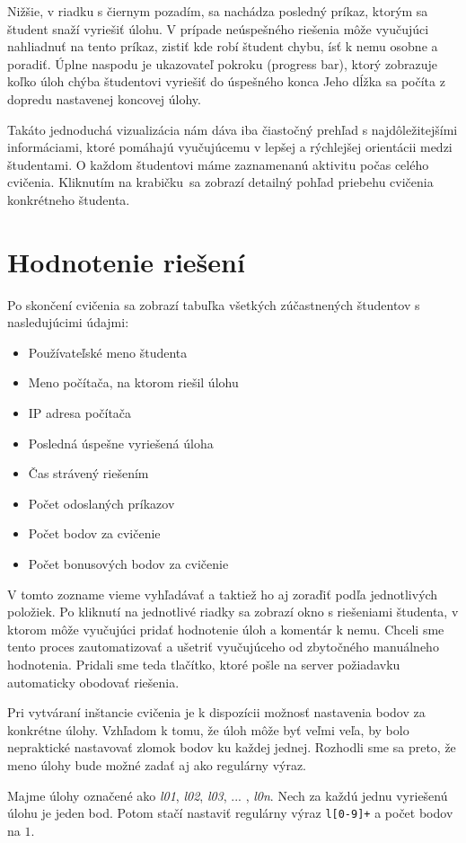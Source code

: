 Nižšie, v riadku s čiernym pozadím, sa nachádza posledný príkaz, ktorým sa študent
snaží vyriešiť úlohu. V prípade neúspešného riešenia môže vyučujúci nahliadnuť na
tento príkaz, zistiť kde robí študent chybu, ísť k nemu osobne a poradiť. Úplne
naspodu je ukazovateľ pokroku (progress bar), ktorý zobrazuje koľko úloh chýba
študentovi vyriešiť do úspešného konca Jeho dĺžka sa počíta z dopredu nastavenej
koncovej úlohy.

Takáto jednoduchá vizualizácia nám dáva iba čiastočný prehľad s najdôležitejšími
informáciami, ktoré pomáhajú vyučujúcemu v lepšej a rýchlejšej orientácii medzi
študentami. O každom študentovi máme zaznamenanú aktivitu počas celého cvičenia.
Kliknutím na \glqq krabičku\grqq ~sa zobrazí detailný pohľad priebehu cvičenia
konkrétneho študenta.

\section{Hodnotenie riešení}
\label{sec:evaluateexercise}

Po skončení cvičenia sa zobrazí tabuľka všetkých zúčastnených študentov s nasledujúcimi
údajmi:

\begin{itemize}
	\item Používateľské meno študenta
	\item Meno počítača, na ktorom riešil úlohu
	\item IP adresa počítača
	\item Posledná úspešne vyriešená úloha
	\item Čas strávený riešením
	\item Počet odoslaných príkazov
	\item Počet bodov za cvičenie
	\item Počet bonusových bodov za cvičenie
\end{itemize}

V tomto zozname vieme vyhľadávať a taktiež ho aj zoraďiť podľa jednotlivých položiek.
Po kliknutí na jednotlivé riadky sa zobrazí okno s riešeniami študenta, v ktorom môže vyučujúci pridať hodnotenie úloh a komentár k nemu. Chceli sme tento proces
zautomatizovať a ušetriť vyučujúceho od zbytočného manuálneho hodnotenia. Pridali sme
teda tlačítko, ktoré pošle na server požiadavku automaticky obodovať riešenia.

Pri vytváraní inštancie cvičenia je k dispozícii možnosť nastavenia bodov za konkrétne
úlohy. Vzhľadom k tomu, že úloh môže byť veľmi veľa, by bolo nepraktické nastavovať
zlomok bodov ku každej jednej. Rozhodli sme sa preto, že meno úlohy bude možné zadať
aj ako regulárny výraz.
\begin{prikl}
	Majme úlohy označené ako \textit{l01}, \textit{l02}, \textit{l03}, ... ,
	\textit{l0n}. Nech za každú jednu vyriešenú úlohu je jeden bod. Potom stačí
	nastaviť regulárny výraz \verb'l[0-9]+' a počet bodov na $1$.
\end{prikl}

